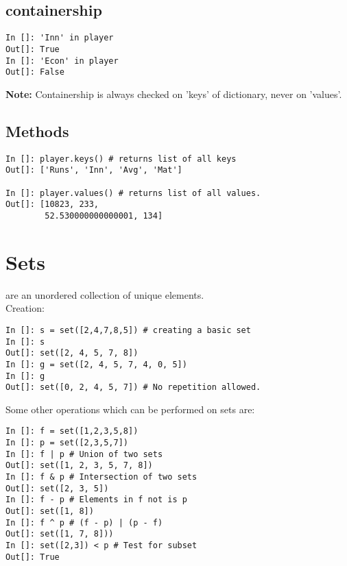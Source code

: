 \documentclass[12pt]{article}
\begin{document}
\subsection{containership}
\begin{lstlisting}
In []: 'Inn' in player
Out[]: True
In []: 'Econ' in player
Out[]: False
\end{lstlisting}
\textbf{Note:} Containership is always checked on 'keys' of dictionary, never on 'values'.\\
\subsection{Methods}
\begin{lstlisting}
In []: player.keys() # returns list of all keys
Out[]: ['Runs', 'Inn', 'Avg', 'Mat']

In []: player.values() # returns list of all values.
Out[]: [10823, 233, 
        52.530000000000001, 134]  
\end{lstlisting}
\section{Sets}
are an unordered collection of unique elements.\\
Creation:
\begin{lstlisting}
In []: s = set([2,4,7,8,5]) # creating a basic set
In []: s
Out[]: set([2, 4, 5, 7, 8])
In []: g = set([2, 4, 5, 7, 4, 0, 5])
In []: g
Out[]: set([0, 2, 4, 5, 7]) # No repetition allowed.
\end{lstlisting}
Some other operations which can be performed on sets are:
\begin{lstlisting}
In []: f = set([1,2,3,5,8])
In []: p = set([2,3,5,7])
In []: f | p # Union of two sets
Out[]: set([1, 2, 3, 5, 7, 8])
In []: f & p # Intersection of two sets
Out[]: set([2, 3, 5])
In []: f - p # Elements in f not is p
Out[]: set([1, 8])
In []: f ^ p # (f - p) | (p - f)
Out[]: set([1, 7, 8])) 
In []: set([2,3]) < p # Test for subset
Out[]: True
\end{lstlisting}
\end{document}
